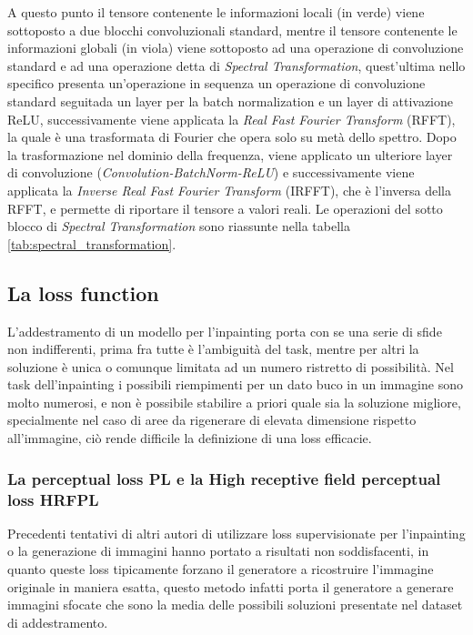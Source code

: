 A questo punto il tensore contenente le informazioni locali (in verde) viene sottoposto a due blocchi convoluzionali standard, mentre il tensore contenente
le informazioni globali (in viola) viene sottoposto ad una operazione di convoluzione standard e ad una operazione detta di \textit{Spectral Transformation},
quest'ultima nello specifico presenta un'operazione in sequenza un operazione di convoluzione standard seguitada un layer per la batch normalization e 
un layer di attivazione ReLU, successivamente viene applicata la \textit{Real Fast Fourier Transform} (RFFT), la quale è una trasformata di Fourier
che opera solo su metà dello spettro. Dopo la trasformazione nel dominio della frequenza, viene applicato un ulteriore layer di convoluzione
(\textit{Convolution-BatchNorm-ReLU}) e successivamente viene applicata la \textit{Inverse Real Fast Fourier Transform} (IRFFT), che è l'inversa della RFFT,
e permette di riportare il tensore a valori reali. Le operazioni del sotto blocco di \textit{Spectral Transformation} sono riassunte nella tabella \ref{tab:spectral_transformation}.

\subsection{La loss function}

L'addestramento di un modello per l'inpainting porta con se una serie di sfide non indifferenti, prima fra tutte è l'ambiguità del task, mentre per altri
la soluzione è unica o comunque limitata ad un numero ristretto di possibilità.
Nel task dell'inpainting i possibili riempimenti per un dato buco in un immagine sono molto numerosi, 
e non è possibile stabilire a priori quale sia la soluzione migliore, specialmente nel caso di aree da rigenerare
di elevata dimensione rispetto all'immagine, ciò rende difficile la definizione di una loss efficacie.

\subsubsection{La perceptual loss PL e la High receptive field perceptual loss HRFPL}
\label{subsubsection:perceptual_loss}

Precedenti tentativi di altri autori di utilizzare loss supervisionate per l'inpainting o la generazione di immagini hanno portato a risultati 
non soddisfacenti, in quanto queste loss tipicamente forzano il generatore a ricostruire l'immagine originale in maniera esatta, 
questo metodo infatti porta il generatore a generare immagini sfocate che sono la media delle possibili soluzioni presentate nel dataset di addestramento.


